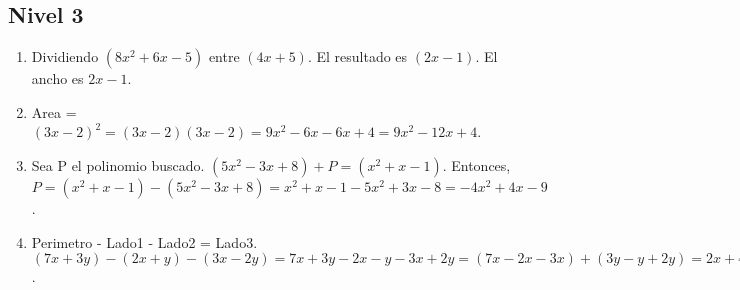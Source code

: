 \documentclass[12pt,a4paper]{article}
\begin{document}
\subsection*{Nivel 3}
\begin{enumerate}
    \item Dividiendo $(8x^2 + 6x - 5)$ entre $(4x+5)$. El resultado es $(2x-1)$. El ancho es $2x-1$.
    \item Area = $(3x-2)^2 = (3x-2)(3x-2) = 9x^2 - 6x - 6x + 4 = 9x^2 - 12x + 4$.
    \item Sea P el polinomio buscado. $(5x^2 - 3x + 8) + P = (x^2 + x - 1)$. Entonces, $P = (x^2 + x - 1) - (5x^2 - 3x + 8) = x^2+x-1-5x^2+3x-8 = -4x^2+4x-9$.
    \item Perimetro - Lado1 - Lado2 = Lado3. $(7x+3y) - (2x+y) - (3x-2y) = 7x+3y-2x-y-3x+2y = (7x-2x-3x) + (3y-y+2y) = 2x+4y$.
\end{enumerate}
\end{document}
